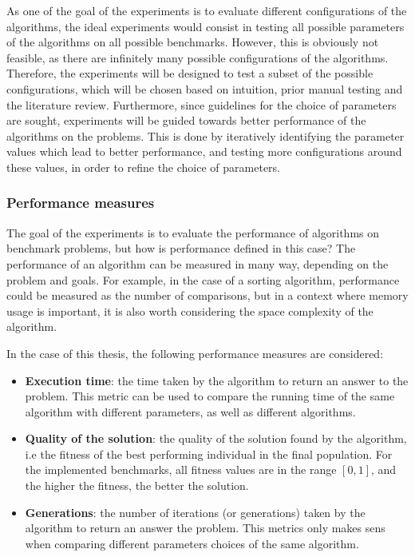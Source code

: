 As one of the goal of the experiments is to evaluate different configurations of the algorithms, the ideal experiments would consist in testing all possible parameters of the algorithms on all possible benchmarks.
However, this is obviously not feasible, as there are infinitely many possible configurations of the algorithms. Therefore, the experiments will be designed to test a subset of the possible configurations, which
will be chosen based on intuition, prior manual testing and the literature review. Furthermore, since guidelines for the choice of parameters are sought, experiments will be guided towards
better performance of the algorithms on the problems. This is done by iteratively identifying the parameter values which lead to better performance, and testing more configurations around these values, in order
to refine the choice of parameters.

\subsubsection{Performance measures}

The goal of the experiments is to evaluate the performance of algorithms on benchmark problems, but how is performance defined in this case? The performance of an algorithm can be measured in many way,
depending on the problem and goals. For example, in the case of a sorting algorithm, performance could be measured as the number of comparisons, but in a context where memory usage is important, it is also
worth considering the space complexity of the algorithm.

In the case of this thesis, the following performance measures are considered:

\begin{itemize}
    \item \textbf{Execution time}: the time taken by the algorithm to return an answer to the problem. This metric can be used to compare the running time of the same algorithm with different parameters, as well as
        different algorithms.
    \item \textbf{Quality of the solution}: the quality of the solution found by the algorithm, i.e the fitness of the best performing individual in the final population. For the implemented benchmarks, all
    fitness values are in the range $[0, 1]$, and the higher the fitness, the better the solution.
\item \textbf{Generations}: the number of iterations (or generations) taken by the algorithm to return an answer the problem. This metrics only makes sens when comparing different parameters choices of the same algorithm.
\end{itemize}

